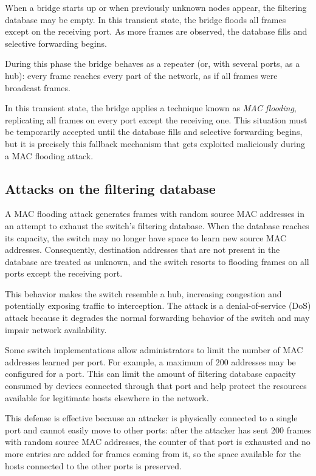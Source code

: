\documentclass[11pt,a4paper,openany]{report}
\begin{document}
When a bridge starts up or when previously unknown nodes appear, the filtering database may be empty. In this transient state, the bridge floods all frames except on the receiving port. As more frames are observed, the database fills and selective forwarding begins.

During this phase the bridge behaves as a repeater (or, with several ports, as a hub): every frame reaches every part of the network, as if all frames were broadcast frames.


In this transient state, the bridge applies a technique known as \textit{MAC flooding}, replicating all frames on every port except the receiving one. This situation must be temporarily accepted until the database fills and selective forwarding begins, but it is precisely this fallback mechanism that gets exploited maliciously during a MAC flooding attack.

\subsection{Attacks on the filtering database}

A MAC flooding attack generates frames with random source MAC addresses in an attempt to exhaust the switch's filtering database. When the database reaches its capacity, the switch may no longer have space to learn new source MAC addresses. Consequently, destination addresses that are not present in the database are treated as unknown, and the switch resorts to flooding frames on all ports except the receiving port.

This behavior makes the switch resemble a hub, increasing congestion and potentially exposing traffic to interception. The attack is a denial-of-service (DoS) attack because it degrades the normal forwarding behavior of the switch and may impair network availability.

Some switch implementations allow administrators to limit the number of MAC addresses learned per port. For example, a maximum of 200 addresses may be configured for a port. This can limit the amount of filtering database capacity consumed by devices connected through that port and help protect the resources available for legitimate hosts elsewhere in the network.

This defense is effective because an attacker is physically connected to a single port and cannot easily move to other ports: after the attacker has sent 200 frames with random source MAC addresses, the counter of that port is exhausted and no more entries are added for frames coming from it, so the space available for the hosts connected to the other ports is preserved.
\end{document}
